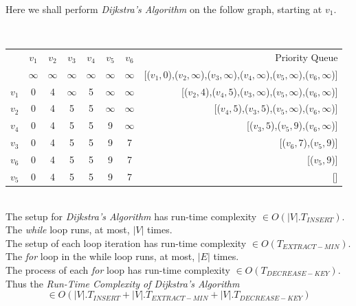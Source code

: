\documentclass[11pt,a4paper]{article}
\begin{document}
Here we shall perform \textit{Dijkstra's Algorithm} on the follow graph, starting at $v_1$.\\
\\
\begin{tabular}{|c|c|c|c|c|c|c|r}
\cline{0-6}
&$v_1$&$v_2$&$v_3$&$v_4$&$v_5$&$v_6$&Priority Queue\\
\cline{0-6}
&$\infty$&$\infty$&$\infty$&$\infty$&$\infty$&$\infty$&[($v_1,0$),($v_2,\infty$),($v_3,\infty$),($v_4,\infty$),($v_5,\infty$),($v_6,\infty$)]\\
$v_1$&0&4&$\infty$&5&$\infty$&$\infty$&[($v_2,4$),($v_4,5$),($v_3,\infty$),($v_5,\infty$),($v_6,\infty$)]\\
$v_2$&0&4&5&5&$\infty$&$\infty$&[($v_4,5$),($v_3,5$),($v_5,\infty$),($v_6,\infty$)]\\
$v_4$&0&4&5&5&9&$\infty$&[($v_3,5$),($v_5,9$),($v_6,\infty$)]\\
$v_3$&0&4&5&5&9&7&[($v_6,7$),($v_5,9$)]\\
$v_6$&0&4&5&5&9&7&[($v_5,9$)]\\
$v_5$&0&4&5&5&9&7&[]\\
\cline{0-6}
\end{tabular}\\

\newpage
{}
The setup for \textit{Dijkstra's Algorithm} has run-time complexity $\in O(|V|.T_{INSERT})$.\\
The \textit{while} loop runs, at most, $|V|$ times.\\
The setup of each loop iteration has run-time complexity $\in O(T_{EXTRACT-MIN})$.\\
The \textit{for} loop in the while loop runs, at most, $|E|$ times.\\
The process of each \textit{for} loop has run-time complexity $\in O(T_{DECREASE-KEY})$.\\
Thus the \textit{Run-Time Complexity of Dijkstra's Algorithm} $$\in O(|V|.T_{INSERT}+|V|.T_{EXTRACT-MIN}+|V|.T_{DECREASE-KEY})$$
\end{document}
